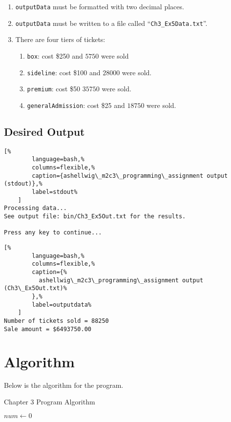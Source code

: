 \documentclass[a4paper, 11pt]{article}
\begin{document}
      \begin{enumerate}
        \item \texttt{outputData} must be formatted with two decimal places.
        \item \texttt{outputData} must be written to a file called
          ``\texttt{Ch3\_Ex5Data.txt}''.
        \item There are four tiers of tickets:
          \begin{enumerate}
            \item \texttt{box}: cost \$250 and $5750$ were sold
            \item \texttt{sideline}: cost \$100 and $28000$ were sold.
            \item \texttt{premium}: cost \$50 $35750$ were sold.
            \item \texttt{generalAdmission}: cost \$25 and $18750$ were sold.
          \end{enumerate}
      \end{enumerate}

    \subsection{Desired Output}
      \begin{lstlisting}[%
        language=bash,%
        columns=flexible,%
        caption={ashellwig\_m2c3\_programming\_assignment output (stdout)},%
        label=stdout%
    ]
Processing data...
See output file: bin/Ch3_Ex5Out.txt for the results.

Press any key to continue...
      \end{lstlisting}

      \begin{lstlisting}[%
        language=bash,%
        columns=flexible,%
        caption={%
          ashellwig\_m2c3\_programming\_assignment output (Ch3\_Ex5Out.txt)%
        },%
        label=outputdata%
    ]
Number of tickets sold = 88250
Sale amount = $6493750.00
      \end{lstlisting}


  \newpage
  \section{Algorithm}
    Below is the algorithm for the program.
    \begin{algorithm}[h]
      \caption{Chapter 3 Program Algorithm}
      \vspace{12pt}
      \begin{algorithmic}[1]
        \State
          \State $num\gets 0$
        \EndFunction
      \end{algorithmic}
      \label{alg:c3program}
    \end{algorithm}
\end{document}
